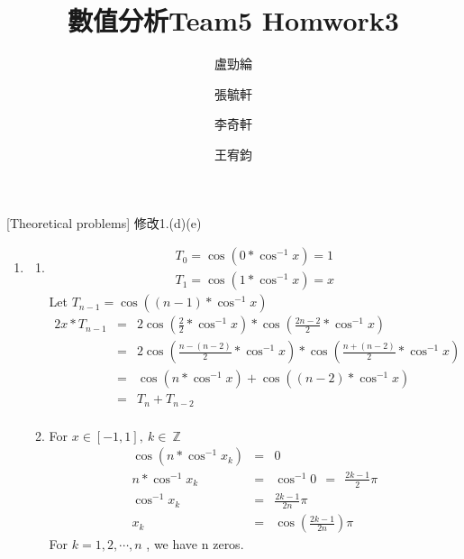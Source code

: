 \documentclass[12pt]{article}
\title{數值分析Team5 Homwork3}
\author{盧勁綸\and 張毓軒\and 李奇軒\and 王宥鈞}
\date{}
\begin{document}
\maketitle

[Theoretical problems] 修改1.(d)(e)
\begin{enumerate}
    \item
        \begin{enumerate}
            \item %
            \begin{eqnarray*}
                T_0=\cos(0*\cos^{-1}x)=1 \\
                T_1=\cos(1*\cos^{-1}x)=x 
            \end{eqnarray*} 
            Let $T_{n-1}=\cos((n-1)*\cos^{-1}x)$
            \begin{eqnarray*}
                2x*T_{n-1}&=&2\cos(\frac{2}{2}*\cos^{-1}x)*\cos(\frac{2n-2}{2}*\cos^{-1}x)\\
                &=&2\cos(\frac{n-(n-2)}{2}*\cos^{-1}x)*\cos(\frac{n+(n-2)}{2}*\cos^{-1}x)\\
                &=&\cos(n*\cos^{-1}x)+\cos((n-2)*\cos^{-1}x)\\
                &=&T_n+T_{n-2}\\
            \end{eqnarray*}
            
            \item %
            For $x\in[-1,1],\ k\in\  \mathbb{Z} $
            \begin{eqnarray*}
            \cos(n*\cos^{-1}x_k)&=&0\\
            n*\cos^{-1}x_k&=&\cos^{-1}0\ \ =\ \ \frac{2k-1}{2}\pi\\
            \cos^{-1}x_k&=&\frac{2k-1}{2n}\pi\\
            x_k&=&\cos(\frac{2k-1}{2n})\pi
            \end{eqnarray*}
            For $k=1,2,\cdots,n$ , we have n zeros.
            

\end{enumerate}
\end{enumerate}
\end{document}
